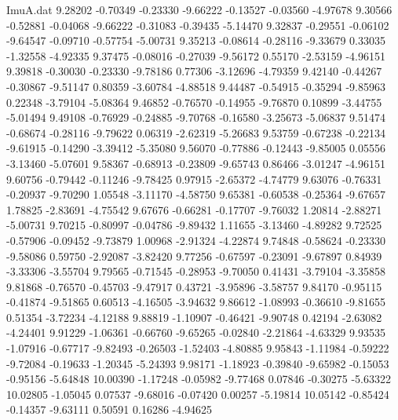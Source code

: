 \begin{filecontents}{ImuA.dat}
   9.28202   -0.70349   -0.23330   -9.66222   -0.13527   -0.03560   -4.97678
   9.30566   -0.52881   -0.04068   -9.66222   -0.31083   -0.39435   -5.14470
   9.32837   -0.29551   -0.06102   -9.64547   -0.09710   -0.57754   -5.00731
   9.35213   -0.08614   -0.28116   -9.33679    0.33035   -1.32558   -4.92335
   9.37475   -0.08016   -0.27039   -9.56172    0.55170   -2.53159   -4.96151
   9.39818   -0.30030   -0.23330   -9.78186    0.77306   -3.12696   -4.79359
   9.42140   -0.44267   -0.30867   -9.51147    0.80359   -3.60784   -4.88518
   9.44487   -0.54915   -0.35294   -9.85963    0.22348   -3.79104   -5.08364
   9.46852   -0.76570   -0.14955   -9.76870    0.10899   -3.44755   -5.01494
   9.49108   -0.76929   -0.24885   -9.70768   -0.16580   -3.25673   -5.06837
   9.51474   -0.68674   -0.28116   -9.79622    0.06319   -2.62319   -5.26683
   9.53759   -0.67238   -0.22134   -9.61915   -0.14290   -3.39412   -5.35080
   9.56070   -0.77886   -0.12443   -9.85005    0.05556   -3.13460   -5.07601
   9.58367   -0.68913   -0.23809   -9.65743    0.86466   -3.01247   -4.96151
   9.60756   -0.79442   -0.11246   -9.78425    0.97915   -2.65372   -4.74779
   9.63076   -0.76331   -0.20937   -9.70290    1.05548   -3.11170   -4.58750
   9.65381   -0.60538   -0.25364   -9.67657    1.78825   -2.83691   -4.75542
   9.67676   -0.66281   -0.17707   -9.76032    1.20814   -2.88271   -5.00731
   9.70215   -0.80997   -0.04786   -9.89432    1.11655   -3.13460   -4.89282
   9.72525   -0.57906   -0.09452   -9.73879    1.00968   -2.91324   -4.22874
   9.74848   -0.58624   -0.23330   -9.58086    0.59750   -2.92087   -3.82420
   9.77256   -0.67597   -0.23091   -9.67897    0.84939   -3.33306   -3.55704
   9.79565   -0.71545   -0.28953   -9.70050    0.41431   -3.79104   -3.35858
   9.81868   -0.76570   -0.45703   -9.47917    0.43721   -3.95896   -3.58757
   9.84170   -0.95115   -0.41874   -9.51865    0.60513   -4.16505   -3.94632
   9.86612   -1.08993   -0.36610   -9.81655    0.51354   -3.72234   -4.12188
   9.88819   -1.10907   -0.46421   -9.90748    0.42194   -2.63082   -4.24401
   9.91229   -1.06361   -0.66760   -9.65265   -0.02840   -2.21864   -4.63329
   9.93535   -1.07916   -0.67717   -9.82493   -0.26503   -1.52403   -4.80885
   9.95843   -1.11984   -0.59222   -9.72084   -0.19633   -1.20345   -5.24393
   9.98171   -1.18923   -0.39840   -9.65982   -0.15053   -0.95156   -5.64848
  10.00390   -1.17248   -0.05982   -9.77468    0.07846   -0.30275   -5.63322
  10.02805   -1.05045    0.07537   -9.68016   -0.07420    0.00257   -5.19814
  10.05142   -0.85424   -0.14357   -9.63111    0.50591    0.16286   -4.94625

\end{filecontents}
